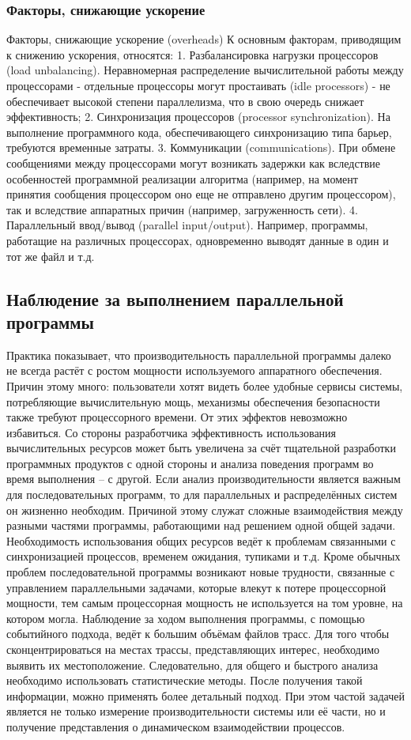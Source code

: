 \subsubsection{Факторы, снижающие ускорение }
Факторы, снижающие ускорение (overheads)
К основным факторам, приводящим к снижению ускорения, относятся: 
1. Разбалансировка нагрузки процессоров (load unbalancing). Неравномерная распределение вычислительной работы между процессорами - отдельные процессоры могут простаивать (idle processors) - не обеспечивает высокой степени параллелизма, что в свою очередь снижает эффективность; 
2. Синхронизация процессоров (processor synchronization). На выполнение программного кода, обеспечивающего синхронизацию типа барьер, требуются временные затраты. 
3. Коммуникации (communications). При обмене сообщениями между процессорами могут возникать задержки как вследствие особенностей программной реализации алгоритма (например, на момент принятия сообщения процессором оно еще не отправлено другим процессором), так и вследствие аппаратных причин (например, загруженность сети). 
4. Параллельный ввод/вывод (parallel input/output). Например, программы, работащие на различных процессорах, одновременно выводят данные в один и тот же файл и т.д. 
\subsection{Наблюдение за выполнением параллельной программы}
Практика показывает, что производительность параллельной программы далеко не всегда растёт с ростом мощности используемого аппаратного обеспечения. Причин этому много: пользователи хотят видеть более удобные сервисы системы, потребляющие вычислительную мощь, механизмы обеспечения безопасности также требуют процессорного времени. От этих эффектов невозможно избавиться.
Со стороны разработчика эффективность использования вычислительных ресурсов может быть увеличена за счёт тщательной разработки программных продуктов с одной стороны и анализа поведения программ во время выполнения – с другой. Если анализ производительности является важным для последовательных программ, то для параллельных и распределённых систем он жизненно необходим. Причиной этому служат сложные взаимодействия между разными частями программы, работающими над решением одной общей задачи.
Необходимость использования общих ресурсов ведёт к проблемам связанными с синхронизацией процессов, временем ожидания, тупиками и т.д. Кроме обычных проблем последовательной программы возникают новые трудности, связанные с управлением параллельными задачами, которые влекут к потере процессорной мощности, тем самым  процессорная мощность не используется на том уровне, на котором могла.
Наблюдение за ходом выполнения программы, с помощью событийного подхода, ведёт к большим объёмам файлов трасс. Для того чтобы сконцентрироваться на местах трассы, представляющих интерес, необходимо выявить их местоположение. Следовательно, для общего и быстрого анализа необходимо использовать статистические методы. После получения такой информации, можно применять более детальный подход. При этом частой задачей является не только измерение производительности системы или её части, но и получение представления о динамическом взаимодействии процессов.
